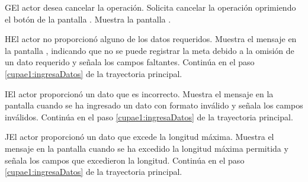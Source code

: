\begin{UCtrayectoriaA}{G}{El actor desea cancelar la operación.}
	\UCpaso[\UCactor] Solicita cancelar la operación oprimiendo el botón  de la pantalla .
	\UCpaso[\UCsist] Muestra la pantalla  .
\end{UCtrayectoriaA} 

\begin{UCtrayectoriaA}{H}{El actor no proporcionó alguno de los datos requeridos.}
	\UCpaso[\UCsist] Muestra el mensaje  en la pantalla ,
	indicando que no se puede registrar la meta debido a la omisión de un dato requerido y señala los campos faltantes.
	\UCpaso[] Continúa en el paso \ref{cupae1:ingresaDatos} de la trayectoria principal.
\end{UCtrayectoriaA}

\begin{UCtrayectoriaA}{I}{El actor proporcionó un dato que es incorrecto.}
	\UCpaso[\UCsist] Muestra el mensaje  en la pantalla 
	cuando se ha ingresado un dato con formato inválido y señala los campos inválidos.
	\UCpaso[] Continúa en el paso \ref{cupae1:ingresaDatos} de la trayectoria principal.
\end{UCtrayectoriaA}
 
\begin{UCtrayectoriaA}{J}{El actor proporcionó un dato que excede la longitud máxima.}
	\UCpaso[\UCsist] Muestra el mensaje  en la pantalla 
	cuando se ha excedido la longitud máxima permitida y señala los campos que excedieron la longitud.
	\UCpaso[] Continúa en el paso \ref{cupae1:ingresaDatos} de la trayectoria principal.
\end{UCtrayectoriaA}
